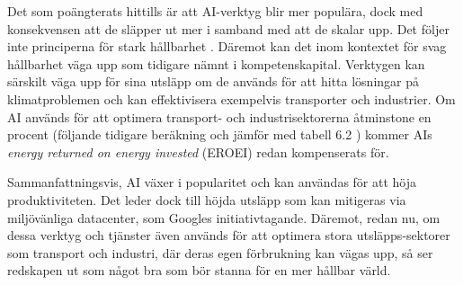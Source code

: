 \documentclass[12pt]{article}
\begin{document}
Det som poängterats hittills är att AI-verktyg blir mer populära, dock med
konsekvensen att de släpper ut mer i samband med att de skalar upp. Det följer
inte principerna för stark hållbarhet \cite[15]{gullikssonHolmgren}. Däremot
kan det inom kontextet för svag hållbarhet \cite[15]{gullikssonHolmgren} väga
upp som tidigare nämnt i kompetenskapital. Verktygen kan särskilt väga upp för
sina utsläpp om de används för att hitta lösningar på klimatproblemen och kan
effektivisera exempelvis transporter och industrier. Om AI används för att
optimera transport- och industrisektorerna åtminstone en procent (följande
tidigare beräkning och jämför med tabell 6.2 \cite[265]{gullikssonHolmgren})
kommer AIs \textit{energy returned on energy invested} (EROEI) redan
kompenserats för.

Sammanfattningsvis, AI växer i popularitet och kan användas för att höja
produktiviteten. Det leder dock till höjda utsläpp som kan mitigeras via
miljövänliga datacenter, som Googles initiativtagande. Däremot, redan nu,
om dessa verktyg och tjänster även används för att optimera stora
utsläpps-sektorer som transport och industri, där deras egen förbrukning kan
vägas upp, så ser redskapen ut som något bra som bör stanna för en mer hållbar
värld.

\printbibliography
\end{document}
